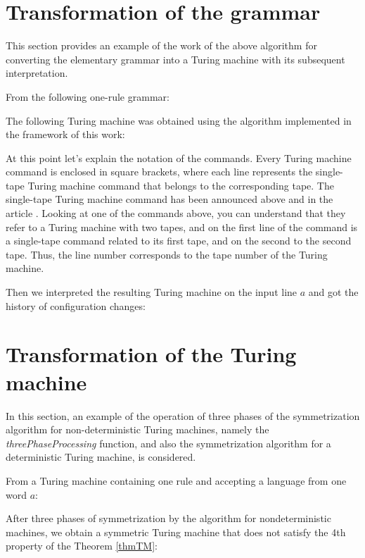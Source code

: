 \documentclass[conference]{IEEEtran}
\theoremstyle{definition}
\begin{document}
\begin{appendices}

\section{Transformation of the grammar} \label{app:grammar_example}

This section provides an example of the work of the above algorithm for converting the elementary grammar into a Turing machine with its subsequent interpretation.

From the following one-rule grammar:


The following Turing machine was obtained using the algorithm implemented in the framework of this work:


At this point let's explain the notation of the commands. Every Turing machine command is enclosed in square brackets, where each line represents the single-tape Turing machine command that belongs to the corresponding tape. The single-tape Turing machine command has been announced above and in the article \cite{Sapir}. Looking at one of the commands above, you can understand that they refer to a Turing machine with two tapes, and on the first line of the command is a single-tape command related to its first tape, and on the second to the second tape. Thus, the line number corresponds to the tape number of the Turing machine.

Then we interpreted the resulting Turing machine on the input line $ a $ and got the history of configuration changes:


\section{Transformation of the Turing machine} \label{app:tm_example}

In this section, an example of the operation of three phases of the symmetrization algorithm for non-deterministic Turing machines, namely the \textit{threePhaseProcessing} function, and also the symmetrization algorithm for a deterministic Turing machine, is considered.

From a Turing machine containing one rule and accepting a language from one word $ a $:


After three phases of symmetrization by the algorithm for nondeterministic machines, we obtain a symmetric Turing machine that does not satisfy the 4th property of the Theorem \ref{thmTM}:



\end{appendices}
\end{document}
